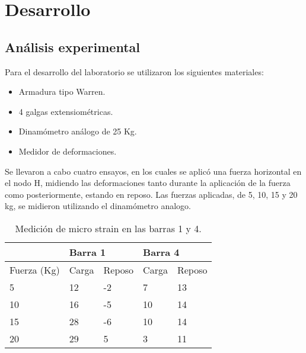\documentclass[
	spanish, %
	oneside
]{article}
\begin{document}
\newpage
\section{Desarrollo}
\subsection{Análisis experimental}
	Para el desarrollo del laboratorio se utilizaron los siguientes materiales:
	\begin{multicols}{2}
		\begin{itemize}
			\item Armadura tipo Warren.
			\item 4 galgas extensiométricas.
		\end{itemize}
		\begin{itemize}
			\item Dinamómetro análogo de 25 Kg.
			\item Medidor de deformaciones.
		\end{itemize}
	\end{multicols}

	\noindent Se llevaron a cabo cuatro ensayos, en los cuales se aplicó una fuerza horizontal en el nodo H,
	midiendo las deformaciones tanto durante la aplicación de la fuerza como posteriormente, 
	estando en reposo. Las fuerzas aplicadas, de 5, 10, 15 y 20 kg, se midieron utilizando el dinamómetro
	analogo.

	\begin{table}
		\centering		
		\begin{tabular}{lllll}
			\cline{2-5}
						& \multicolumn{2}{l}{Barra 1} & \multicolumn{2}{l}{Barra 4} \\ \hline
			Fuerza (Kg) & Carga        & Reposo       & Carga        & Reposo       \\ \hline
			5           & 12           & -2           & 7            & 13           \\
			10          & 16           & -5           & 10           & 14           \\
			15          & 28           & -6           & 10           & 14           \\
			20          & 29           & 5            & 3            & 11           \\ \hline
			\end{tabular}
		\label{tab:tabla-mediciones}
		\caption{Medición de micro strain en las barras 1 y 4.}
	\end{table}
	
\end{document}

